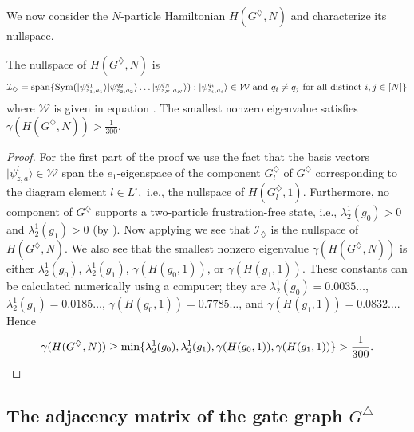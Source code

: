 \documentclass[../thesis-main/thesis-main]{subfiles}
\begin{document}
We now consider the $N$-particle Hamiltonian $H(G^{\diamondsuit},N)$ and characterize its nullspace.

\begin{lemma}
\label{lem:The-nullspace-of_Hdiamond}The nullspace of $H(G^{\diamondsuit},N)$
is 
\[
\mathcal{I}_{\diamondsuit}=\operatorname{span}\{ \operatorname{Sym}(|\psi_{z_{1},a_{1}}^{q_{1}}\rangle|\psi_{z_{2},a_{2}}^{q_{2}}\rangle\ldots|\psi_{z_{N},a_{N}}^{q_{N}}\rangle):|\psi_{z_{i},a_{i}}^{q_{i}}\rangle\in\mathcal{W}\text{ and }q_{i}\neq q_{j}\text{ for all distinct }i,j\in[N]\} 
\]
where $\mathcal{W}$ is given in equation . The smallest nonzero eigenvalue satisfies $\gamma(H(G^{\diamondsuit},N)) > \frac{1}{300}$.
\end{lemma}

\begin{proof}
For the first part of the proof we use the fact that the basis vectors $|\psi_{z,a}^{l}\rangle\in\mathcal{W}$ span the $e_{1}$-eigenspace of the component $G_{l}^{\diamondsuit}$ of $G^{\diamondsuit}$ corresponding to the diagram element $l\in L^{\square},$ i.e., the nullspace of $H(G_{l}^{\diamondsuit},1)$. Furthermore, no component of $G^{\diamondsuit}$ supports a two-particle frustration-free state, i.e., $\lambda_{2}^{1}(g_{0})>0$ and $\lambda_{2}^{1}(g_{1})>0$ (by ). Now applying  we see that $\mathcal{I}_{\diamondsuit}$ is the nullspace of $H(G^{\diamondsuit},N)$. We also see that the smallest nonzero eigenvalue $\gamma(H(G^{\diamondsuit},N))$ is either $\lambda_{2}^{1}(g_{0})$, $\lambda_{2}^{1}(g_{1})$, $\gamma(H(g_{0},1))$, or $\gamma(H(g_{1},1))$. These constants can be calculated numerically using a computer; they are $\lambda_{2}^{1}(g_{0})=0.0035\ldots$, $\lambda_{2}^{1}(g_{1})=0.0185\ldots$, $\gamma(H(g_{0},1))=0.7785\ldots$, and $\gamma(H(g_{1},1))=0.0832\ldots$. Hence
\[
\gamma(H(G^{\diamondsuit},N))\geq\min\{ \lambda_{2}^{1}(g_{0}),\lambda_{2}^{1}(g_{1}),\gamma(H(g_{0},1)),\gamma(H(g_{1},1))\} > \frac{1}{300}. \qedhere
\]
\end{proof}

\subsection{The adjacency matrix of the gate graph $G^{\triangle}$}
\label{sec:The-gate-graph_G_triangle}
\end{document}
